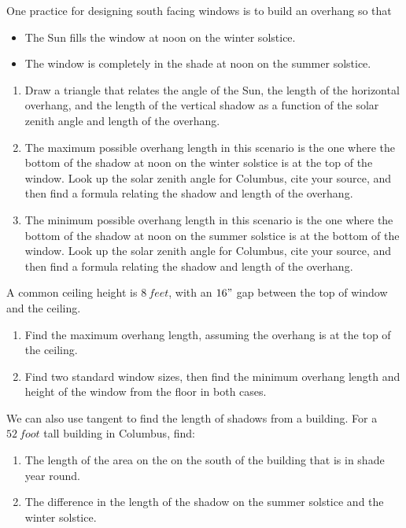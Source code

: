 \documentclass[noauthor,nooutcomes,handout,hints]{ximera}
\begin{document}
\mynewpage


\begin{question}
 One practice for designing south facing windows is to build an
 overhang so that
 \begin{itemize}
 \item The Sun fills the window at noon on the winter solstice.
 \item The window is completely in the shade at noon on the summer
   solstice.
 \end{itemize}
\begin{enumerate}
\item Draw a triangle that relates the angle of the Sun, the length of
  the horizontal overhang, and the length of the vertical shadow as a
  function of the solar zenith angle and length of the overhang.
\item The maximum possible overhang length in this scenario is the one
  where the bottom of the shadow at noon on the winter solstice is at
  the top of the window. Look up the solar zenith angle for Columbus,
  cite your source, and then find a formula relating the shadow and
  length of the overhang.
\item The minimum possible overhang length in this scenario is the one
  where the bottom of the shadow at noon on the summer solstice is at
  the bottom of the window. Look up the solar zenith angle for Columbus, cite
  your source, and then find a formula relating the shadow and length
  of the overhang.
\end{enumerate}
\end{question}
\mynewpage


\begin{question}
 A common ceiling height is $8\ feet$, with an $16"$ gap between the top of window and the ceiling. 
 
\begin{enumerate}
 \item Find the maximum overhang length, assuming the overhang is at the top of the ceiling.
 \item Find two standard window sizes, then find the minimum overhang length and height of the window from the floor in both cases.
\end{enumerate}
\end{question}
\mynewpage

\begin{question}
 We can also use tangent to find the length of shadows from a building. For a $52\ foot$ tall building in Columbus, find:
 
\begin{enumerate}
 \item The length of the area on the on the south of the building that is in shade year round.
 \item The difference in the length of the shadow on the summer solstice and the winter solstice.
\end{enumerate}
\end{question}
\end{document}
